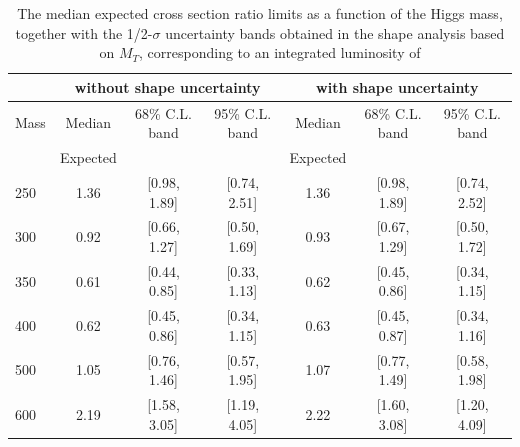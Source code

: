 \begin{table}
\begin{center}
{\normalsize
\begin{tabular}{|l|c|c|c|c|c|c|}
\hline
      &  \multicolumn{3}{c|}{ without shape uncertainty} &\multicolumn{3}{c|}{ with shape uncertainty} \\
\hline
Mass  &  Median      &     68\% C.L. band &  95\% C.L. band &  Median	   &	 68\% C.L. band &  95\% C.L. band\\
      &  Expected    &                    &                 &  Expected    &			&		 \\
\hline

250 & 1.36 & [0.98, 1.89] & [0.74, 2.51] & 1.36 & [0.98, 1.89] & [0.74, 2.52] \\
300 & 0.92 & [0.66, 1.27] & [0.50, 1.69] & 0.93 & [0.67, 1.29] & [0.50, 1.72] \\
350 & 0.61 & [0.44, 0.85] & [0.33, 1.13] & 0.62 & [0.45, 0.86] & [0.34, 1.15] \\
400 & 0.62 & [0.45, 0.86] & [0.34, 1.15] & 0.63 & [0.45, 0.87] & [0.34, 1.16] \\
500 & 1.05 & [0.76, 1.46] & [0.57, 1.95] & 1.07 & [0.77, 1.49] & [0.58, 1.98] \\
600 & 2.19 & [1.58, 3.05] & [1.19, 4.05] & 2.22 & [1.60, 3.08] & [1.20, 4.09] \\
\hline
\end{tabular}
}
\end{center}
\caption{The median expected cross section ratio limits as a function 
of the Higgs mass, together with the 1/2-$\sigma$ uncertainty bands obtained in the shape analysis based on $M_T$, 
corresponding to an integrated luminosity of \intlumi}
\label{tab:limits_mtshape_5fb_detail}
\end{table}

